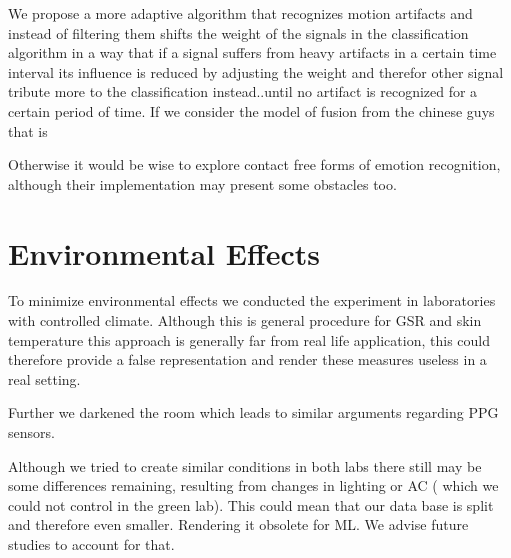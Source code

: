 We propose a more adaptive algorithm that recognizes motion artifacts and instead of filtering them shifts the weight of the signals in the classification algorithm in a way that if a signal suffers from heavy artifacts in a certain time interval its influence is reduced by adjusting the weight and therefor other signal tribute more to the classification instead..until no artifact is recognized for a certain period of time. If we consider the model of fusion from the chinese guys that is

Otherwise it would be wise to explore contact free forms of emotion recognition, although their implementation may present some obstacles too.

\section{Environmental Effects}
To minimize environmental effects we conducted the experiment in laboratories with controlled climate. Although this is general procedure for GSR and skin temperature this approach is generally far from real life application, this could therefore provide a false representation and render these measures useless in a real setting.

Further we darkened the room which leads to similar arguments regarding PPG sensors.

Although we tried to create similar conditions in both labs there still may be some differences remaining, resulting from changes in lighting or AC ( which we could not control in the green lab). This could mean that our data base is split and therefore even smaller. Rendering it obsolete for ML. We advise future studies to account for that.

